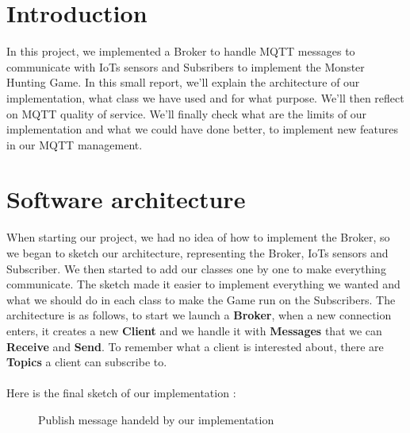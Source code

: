 \documentclass[12pt]{article}
\begin{document}
\thispagestyle{empty}
\tableofcontents
\pagebreak
\setcounter{page}{1}

\section{Introduction}
In this project, we implemented a Broker to handle MQTT messages to communicate with IoTs sensors 
and Subsribers to implement the Monster Hunting Game. In this small report, we'll explain the architecture of our implementation, 
what class we have used and for what purpose. We'll then reflect on MQTT quality of service. We'll finally check what are the limits of our implementation and what we could have done better, 
to implement new features in our MQTT management.

\section{Software architecture}
When starting our project, we had no idea of how to implement the Broker, so we began to sketch our architecture, representing the Broker, IoTs sensors and Subscriber. 
We then started to add our classes one by one to make everything communicate. The sketch made it easier to implement everything we wanted and what we should do in each class to make the Game run on the Subscribers. 
The architecture is as follows, to start we launch a \textbf{Broker}, when a new connection enters, it creates a new \textbf{Client} and we handle it 
with \textbf{Messages} that we can \textbf{Receive} and \textbf{Send}. To remember what a client is interested about, there are \textbf{Topics} a client 
can subscribe to.
\paragraph{}
Here is the final sketch of our implementation : 

\begin{figure}[!h]
	\centering

	\caption{Publish message handeld by our implementation}
\end{figure}
\end{document}
